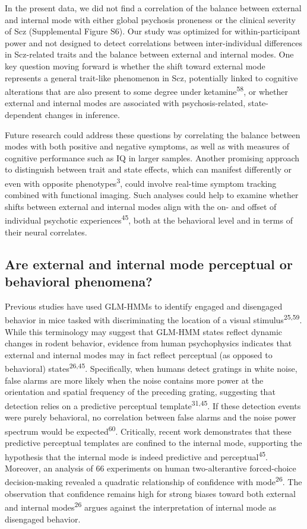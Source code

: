 \documentclass[
]{article}
\begin{document}
In the present data, we did not find a correlation of the balance
between external and internal mode with either global psychosis
proneness or the clinical severity of Scz (Supplemental Figure S6). Our
study was optimized for within-participant power and not designed to
detect correlations between inter-individual differences in Scz-related
traits and the balance between external and internal modes. One key
question moving forward is whether the shift toward external mode
represents a general trait-like phenomenon in Scz, potentially linked to
cognitive alterations that are also present to some degree under
ketamine\textsuperscript{58}, or whether external and internal modes are
associated with psychosis-related, state-dependent changes in inference.

Future research could address these questions by correlating the balance
between modes with both positive and negative symptoms, as well as with
measures of cognitive performance such as IQ in larger samples. Another
promising approach to distinguish between trait and state effects, which
can manifest differently or even with opposite
phenotypes\textsuperscript{3}, could involve real-time symptom tracking
combined with functional imaging. Such analyses could help to examine
whether shifts between external and internal modes align with the on-
and offset of individual psychotic experiences\textsuperscript{45}, both
at the behavioral level and in terms of their neural correlates.

\subsection{Are external and internal mode perceptual or behavioral
phenomena?}\label{are-external-and-internal-mode-perceptual-or-behavioral-phenomena}

Previous studies have used GLM-HMMs to identify engaged and disengaged
behavior in mice tasked with discriminating the location of a visual
stimulus\textsuperscript{25,59}. While this terminology may suggest that
GLM-HMM states reflect dynamic changes in rodent behavior, evidence from
human psychophysics indicates that external and internal modes may in
fact reflect perceptual (as opposed to behavioral)
states\textsuperscript{26,45}. Specifically, when humans detect gratings
in white noise, false alarms are more likely when the noise contains
more power at the orientation and spatial frequency of the preceding
grating, suggesting that detection relies on a predictive perceptual
template\textsuperscript{31,45}. If these detection events were purely
behavioral, no correlation between false alarms and the noise power
spectrum would be expected\textsuperscript{60}. Critically, recent work
demonstrates that these predictive perceptual templates are confined to
the internal mode, supporting the hypothesis that the internal mode is
indeed predictive and perceptual\textsuperscript{45}. Moreover, an
analysis of 66 experiments on human two-alterantive forced-choice
decision-making revealed a quadratic relationship of confidence with
mode\textsuperscript{26}. The observation that confidence remains high
for strong biases toward both external and internal
modes\textsuperscript{26} argues against the interpretation of internal
mode as disengaged behavior.
\end{document}
